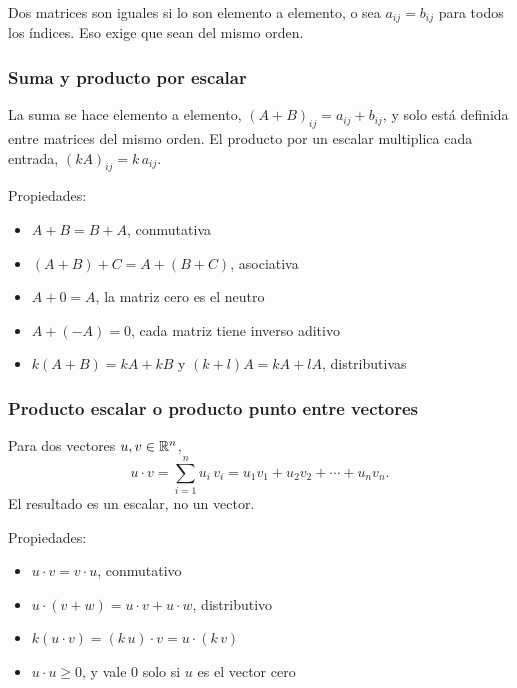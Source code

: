 \documentclass[11pt,letterpaper]{article}
\begin{document}
Dos matrices son iguales si lo son elemento a elemento, o sea
$a_{ij} = b_{ij}$ para todos los índices. Eso exige que sean del mismo
orden.

\subsubsection*{Suma y producto por escalar}

La suma se hace elemento a elemento, $(A + B)_{ij} = a_{ij} + b_{ij}$,
y solo está definida entre matrices del mismo orden. El producto por
un escalar multiplica cada entrada, $(kA)_{ij} = k\,a_{ij}$.

Propiedades:

\begin{itemize}[itemsep=0.1em]
    \item $A + B = B + A$, conmutativa
    \item $(A + B) + C = A + (B + C)$, asociativa
    \item $A + 0 = A$, la matriz cero es el neutro
    \item $A + (-A) = 0$, cada matriz tiene inverso aditivo
    \item $k(A + B) = kA + kB$ y $(k + l)A = kA + lA$, distributivas
\end{itemize}

\subsubsection*{Producto escalar o producto punto entre vectores}

\begin{definicion}
    Para dos vectores $u, v \in \mathbb{R}^{n}$,
    \[
        u \cdot v = \sum_{i=1}^{n} u_i\,v_i
        = u_1 v_1 + u_2 v_2 + \cdots + u_n v_n .
    \]
    El resultado es un escalar, no un vector.
\end{definicion}

Propiedades:

\begin{itemize}[itemsep=0.1em]
    \item $u \cdot v = v \cdot u$, conmutativo
    \item $u \cdot (v + w) = u \cdot v + u \cdot w$, distributivo
    \item $k(u \cdot v) = (k\,u) \cdot v = u \cdot (k\,v)$
    \item $u \cdot u \geq 0$, y vale $0$ solo si $u$ es el vector cero
\end{itemize}
\end{document}
